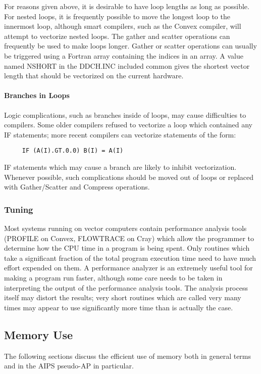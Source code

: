 For reasons given above, it is desirable to have loop lengths as long
as possible.  For nested loops, it is frequently possible to move the
longest loop to the innermost loop, although smart compilers, such as
the Convex compiler, will attempt to vectorize nested loops.  The
gather and scatter operations can frequently be used to make loops
longer.  Gather or scatter operations can usually be triggered using a
Fortran array containing the indices in an array.  A value named
NSHORT in the DDCH.INC included common gives the
shortest vector length that should be vectorized on the current
hardware.

\paragraph{Branches in Loops }
Logic complications, such as branches inside of loops, may cause
difficulties to compilers.  Some older compilers refused to vectorize
a loop which contained any IF statements; more recent compilers can
vectorize statements of the form:
\begin{verbatim}
     IF (A(I).GT.0.0) B(I) = A(I)
\end{verbatim}
IF statements which may cause a branch are likely to inhibit
vectorization.  Whenever possible, such complications should be moved
out of loops or replaced with Gather/Scatter and Compress operations.

\subsubsection{Tuning }
Most systems running on vector computers contain performance analysis
tools (PROFILE on Convex, FLOWTRACE on Cray) which allow the
programmer to determine how the CPU time in a program is being spent.
Only routines which take a significant fraction of the total program
execution time need to have much effort expended on them. A
performance analyzer is an extremely useful tool for making a program
run faster, although some care needs to be taken in interpreting the
output of the performance analysis tools. The analysis process itself
may distort the results; very short routines which are called very
many times may appear to use significantly more time than is actually
the case.

\subsection{Memory Use }
The following sections discuss the efficient use of memory both in
general terms and in the AIPS pseudo-AP in particular.

